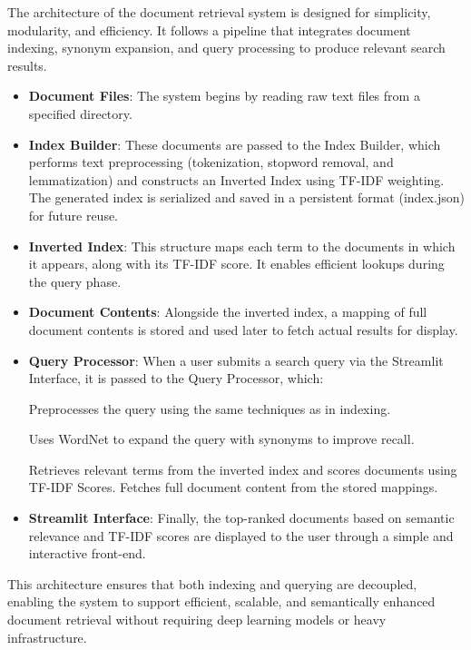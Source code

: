 \documentclass[conference]{IEEEtran}
\begin{document}
The architecture of the document retrieval system is designed for simplicity, modularity, and efficiency. It follows a pipeline that integrates document indexing, synonym expansion, and query processing to produce relevant search results.
\begin{itemize}
\item \textbf{Document Files}: The system begins by reading raw text files from a specified directory.

\item \textbf{Index Builder}: These documents are passed to the Index Builder, which performs text preprocessing (tokenization, stopword removal, and lemmatization) and constructs an Inverted Index using TF-IDF weighting. The generated index is serialized and saved in a persistent format (index.json) for future reuse.

\item \textbf{Inverted Index}: This structure maps each term to the documents in which it appears, along with its TF-IDF score. It enables efficient lookups during the query phase.

\item \textbf{Document Contents}: Alongside the inverted index, a mapping of full document contents is stored and used later to fetch actual results for display.

\item \textbf{Query Processor}: When a user submits a search query via the Streamlit Interface, it is passed to the Query Processor, which:

\subitem Preprocesses the query using the same techniques as in indexing.

\subitem Uses WordNet to expand the query with synonyms to improve recall.

\subitem Retrieves relevant terms from the inverted index and scores documents using TF-IDF Scores. Fetches full document content from the stored mappings.

\item \textbf{Streamlit Interface}: Finally, the top-ranked documents based on semantic relevance and TF-IDF scores are displayed to the user through a simple and interactive front-end.
\end{itemize}


This architecture ensures that both indexing and querying are decoupled, enabling the system to support efficient, scalable, and semantically enhanced document retrieval without requiring deep learning models or heavy infrastructure.
\end{document}

